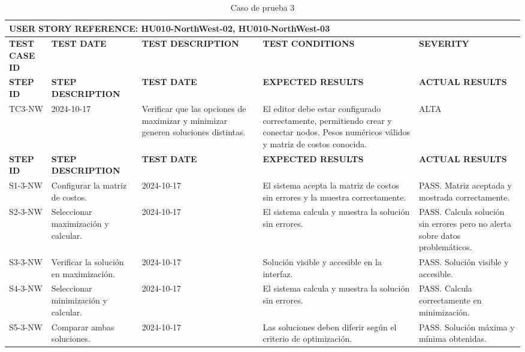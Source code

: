 \documentclass[stu, 12pt, letterpaper, donotrepeattitle, floatsintext, natbib]{apa7}
\begin{document}
\begin{longtable}{|p{2cm}|p{3cm}|p{3cm}|p{3cm}|p{3cm}|}
    \caption{Caso de prueba 3} \label{tab:casos_prueba3} \\
    \hline
        \multicolumn{5}{|l|}{\textbf{USER STORY REFERENCE: HU010-NorthWest-02, HU010-NorthWest-03}} \\ \hline

    \textbf{TEST CASE ID} & \textbf{TEST DATE} & \textbf{TEST DESCRIPTION} & \textbf{TEST CONDITIONS} & \textbf{SEVERITY } \\ \hline
    \endfirsthead
    \hline
    \textbf{STEP ID} & \textbf{STEP DESCRIPTION} & \textbf{TEST DATE} & \textbf{EXPECTED RESULTS} & \textbf{ACTUAL RESULTS} \\ \hline
    \endhead
    TC3-NW & 2024-10-17 & Verificar que las opciones de maximizar y minimizar generen soluciones distintas. & El editor debe estar configurado correctamente, permitiendo crear y conectar nodos. Pesos numéricos válidos y matriz de costos conocida. & ALTA \\ \hline
    \textbf{STEP ID} & \textbf{STEP DESCRIPTION} & \textbf{TEST DATE} & \textbf{EXPECTED RESULTS} & \textbf{ACTUAL RESULTS} \\ \hline
    S1-3-NW & Configurar la matriz de costos. & 2024-10-17 & El sistema acepta la matriz de costos sin errores y la muestra correctamente. & PASS. Matriz aceptada y mostrada correctamente. \\ \hline
    S2-3-NW & Seleccionar maximización y calcular. & 2024-10-17 & El sistema calcula y muestra la solución sin errores. & PASS. Calcula solución sin errores pero no alerta sobre datos problemáticos. \\ \hline
    S3-3-NW & Verificar la solución en maximización. & 2024-10-17 & Solución visible y accesible en la interfaz. & PASS. Solución visible y accesible. \\ \hline
    S4-3-NW & Seleccionar minimización y calcular. & 2024-10-17 & El sistema calcula y muestra la solución sin errores. & PASS. Calcula correctamente en minimización. \\ \hline
    S5-3-NW & Comparar ambas soluciones. & 2024-10-17 & Las soluciones deben diferir según el criterio de optimización. & PASS. Solución máxima y mínima obtenidas. \\ \hline
\end{longtable}
\end{document}

